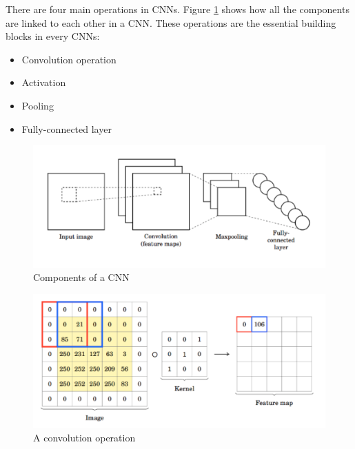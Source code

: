             There are four main operations in CNNs. 
            Figure \ref{fig:convolution_layer} shows how all the components are linked to each other in a CNN.
            These operations are the essential building blocks in every CNNs:
            \begin{itemize}
                \item Convolution operation
                \item Activation
                \item Pooling
                \item Fully-connected layer
            \end{itemize}

            \begin{figure}[h!]
                \centering
                    \includegraphics[width=\linewidth]{figures/convolution_layer.png}
                \caption{Components of a CNN}
                \label{fig:convolution_layer}
            \end{figure}

            \begin{figure}[h!]
                \centering
                    \includegraphics[width=0.8\linewidth]{figures/convolution_operation.png}
                \caption{A convolution operation \cite{VoPa}}
                \label{fig:convolution_operation}
            \end{figure}

